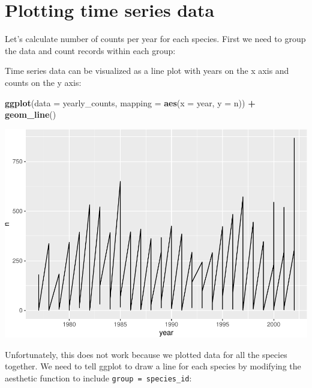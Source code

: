 \documentclass[]{book}
\newenvironment{Shaded}{\begin{snugshade}}{\end{snugshade}}
\newcommand{\KeywordTok}[1]{\textcolor[rgb]{0.13,0.29,0.53}{\textbf{#1}}}
\newcommand{\DataTypeTok}[1]{\textcolor[rgb]{0.13,0.29,0.53}{#1}}
\newcommand{\StringTok}[1]{\textcolor[rgb]{0.31,0.60,0.02}{#1}}
\newcommand{\OperatorTok}[1]{\textcolor[rgb]{0.81,0.36,0.00}{\textbf{#1}}}
\newcommand{\NormalTok}[1]{#1}
\begin{document}
\section{Plotting time series data}\label{plotting-time-series-data}

Let's calculate number of counts per year for each species. First we
need to group the data and count records within each group:

\begin{Shaded}
\end{Shaded}

Time series data can be visualized as a line plot with years on the x
axis and counts on the y axis:

\begin{Shaded}
\begin{Highlighting}[]
\KeywordTok{ggplot}\NormalTok{(}\DataTypeTok{data =}\NormalTok{ yearly_counts, }\DataTypeTok{mapping =} \KeywordTok{aes}\NormalTok{(}\DataTypeTok{x =}\NormalTok{ year, }\DataTypeTok{y =}\NormalTok{ n)) }\OperatorTok{+}
\StringTok{     }\KeywordTok{geom_line}\NormalTok{()}
\end{Highlighting}
\end{Shaded}

\includegraphics{img/R-ecology-first-time-series-1.pdf}

Unfortunately, this does not work because we plotted data for all the
species together. We need to tell ggplot to draw a line for each species
by modifying the aesthetic function to include
\texttt{group\ =\ species\_id}:
\end{document}
